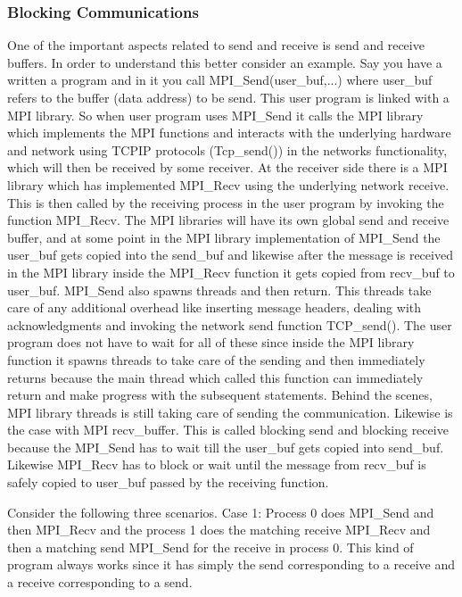 \documentclass[12pt]{article}
\begin{document}
\subsubsection{Blocking Communications}
One of the important aspects related to send and receive is send and receive buffers. In order to understand this better consider an example. Say you have a written a program and in it you call MPI\_Send(user\_buf,...) where user\_buf refers to the buffer (data address) to be send. This user program is linked with a MPI library. So when user program uses MPI\_Send it calls the MPI library which implements the MPI functions and interacts with the underlying hardware and network using TCPIP protocols (Tcp\_send()) in the networks functionality, which will then be received by some receiver. At the receiver side there is a MPI library which has implemented MPI\_Recv using the underlying network receive. This is then called by the receiving process in the user program by invoking the function MPI\_Recv. The MPI libraries will have its own global send and receive buffer, and at some point in the MPI library implementation of MPI\_Send the user\_buf gets copied into the send\_buf and likewise after the message is received in the MPI library inside the MPI\_Recv function it gets copied from recv\_buf to user\_buf. MPI\_Send also spawns threads and then return. This threads take care of any additional overhead like inserting message headers, dealing with acknowledgments and invoking the network send function TCP\_send(). The user program does not have to wait for all of these since inside the MPI library function it spawns threads to take care of the sending and then immediately returns because the main thread which called this function can immediately return and make progress with the subsequent statements. Behind the scenes, MPI library threads is still taking care of sending the communication. Likewise is the case with MPI recv\_buffer. This is called blocking send and blocking receive because the MPI\_Send has to wait till the user\_buf gets copied into send\_buf. Likewise MPI\_Recv has to block or wait until the message from recv\_buf is safely copied to user\_buf passed by the receiving function.

Consider the following three scenarios.
Case 1: Process 0 does MPI\_Send and then MPI\_Recv and the process 1 does the matching receive MPI\_Recv and then a matching send MPI\_Send for the receive in process 0. This kind of program always works since it has simply the send corresponding to a receive and a receive corresponding to a send. 
\end{document}
